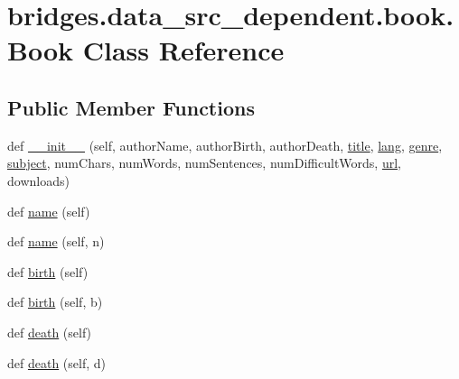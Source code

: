 \hypertarget{classbridges_1_1data__src__dependent_1_1book_1_1_book}{}\section{bridges.\+data\+\_\+src\+\_\+dependent.\+book.\+Book Class Reference}
\label{classbridges_1_1data__src__dependent_1_1book_1_1_book}
\subsection*{Public Member Functions}
\begin{DoxyCompactItemize}
\item 
def \hyperlink{classbridges_1_1data__src__dependent_1_1book_1_1_book_aec4c365cdf13b6f90035e002e21ab448}{\+\_\+\+\_\+init\+\_\+\+\_\+} (self, author\+Name, author\+Birth, author\+Death, \hyperlink{classbridges_1_1data__src__dependent_1_1book_1_1_book_a62542e66172147fef8100c6acb410934}{title}, \hyperlink{classbridges_1_1data__src__dependent_1_1book_1_1_book_ab5c45b128634ba8f6c4e001a0c2dba59}{lang}, \hyperlink{classbridges_1_1data__src__dependent_1_1book_1_1_book_ad1be24582b2d609dba9aab8723c11e62}{genre}, \hyperlink{classbridges_1_1data__src__dependent_1_1book_1_1_book_a7d341f7c11e9debad855369b16ca705b}{subject}, num\+Chars, num\+Words, num\+Sentences, num\+Difficult\+Words, \hyperlink{classbridges_1_1data__src__dependent_1_1book_1_1_book_a22ff8b74af33e50a04d7f017b7cd8012}{url}, downloads)
\item 
def \hyperlink{classbridges_1_1data__src__dependent_1_1book_1_1_book_ae703b5475cd698e62e06d59baceed061}{name} (self)
\item 
def \hyperlink{classbridges_1_1data__src__dependent_1_1book_1_1_book_a80b43302d84f79c62b9b831e7d0cdd1e}{name} (self, n)
\item 
def \hyperlink{classbridges_1_1data__src__dependent_1_1book_1_1_book_a210c6ab89041e93f187fc25026b8b82d}{birth} (self)
\item 
def \hyperlink{classbridges_1_1data__src__dependent_1_1book_1_1_book_a049c19df2e16c01ba6ca007dbe7c42f1}{birth} (self, b)
\item 
def \hyperlink{classbridges_1_1data__src__dependent_1_1book_1_1_book_a5ff13b7ba521a7ebb67c0f539bb7fe37}{death} (self)
\item 
def \hyperlink{classbridges_1_1data__src__dependent_1_1book_1_1_book_ae3f2d7e7b80592c878d6793201fc8a0b}{death} (self, d)
\item 

\end{DoxyCompactItemize}
